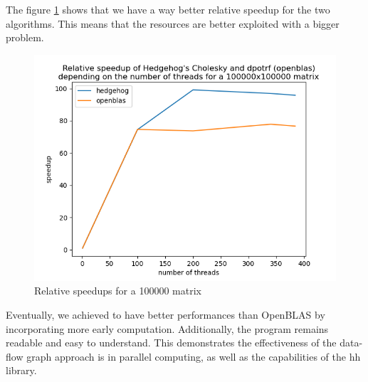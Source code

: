 The figure \ref{fig:relativespeedup100000} shows that we have a way better
relative speedup for the two algorithms. This means that the resources are
better exploited with a bigger problem.

\begin{figure}[!ht]
  \begin{center}
    \includegraphics[scale=0.8]{img/cho-img/relative-speedup-100000.png}
    \caption{Relative speedups for a 100000 matrix}
    \label{fig:relativespeedup100000}
  \end{center}
\end{figure}

Eventually, we achieved to have better performances than OpenBLAS by
incorporating more early computation. Additionally, the program remains readable
and easy to understand. This demonstrates the effectiveness of the data-flow
graph approach is in parallel computing, as well as the capabilities of the
\gls{hh} library.
